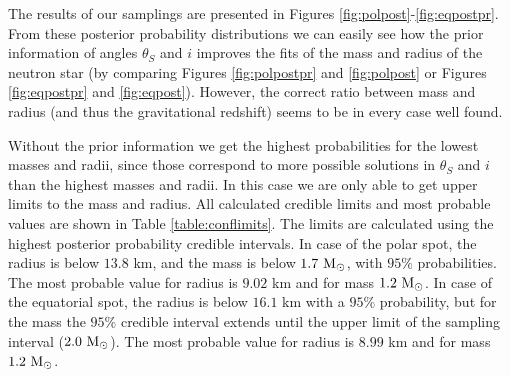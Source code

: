 \documentclass{wihuri}
\def\msun{{\rm M_{\odot}}}
\def\thetas{\theta_{S}}
\begin{document}


The results of our samplings are presented in Figures \ref{fig:polpost}-\ref{fig:eqpostpr}. From these posterior probability distributions we can easily see how the prior information of angles $\thetas$ and $i$ improves the fits of the mass and radius of the neutron star (by comparing Figures \ref{fig:polpostpr} and \ref{fig:polpost} or Figures \ref{fig:eqpostpr} and \ref{fig:eqpost}). However, the correct ratio between mass and radius (and thus the gravitational redshift) seems to be in every case well found.

Without the prior information we get the highest probabilities for the lowest masses and radii, since those correspond to more possible solutions in  $\thetas$ and $i$ than the highest masses and radii. In this case we are only able to get upper limits to the mass and radius. All calculated credible limits and most probable values are shown in Table \ref{table:conflimits}. The limits are calculated using the highest posterior probability credible intervals. In case of the polar spot, the radius is below $13.8$ km, and the mass is below $1.7 ~\msun$, with $95 \%$ probabilities. The most probable value for radius is $9.02$ km and for mass $1.2 ~\msun$. In case of the equatorial spot, the radius is below $16.1$ km with a $95 \%$ probability, but for the mass the $95 \%$ credible interval extends until the upper limit of the sampling interval ($2.0 ~\msun$). The most probable value for radius is $8.99$ km and for mass $1.2 ~\msun$. 
\end{document}
